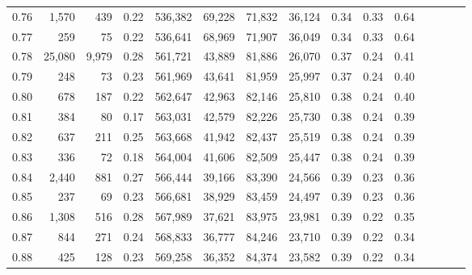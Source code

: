\begin{tabular}{rrrcrrrrrrrrrrr}
0.76 &   1,570 &     439 &                                       0.22 &  536,382 &   69,228 &   71,832 &   36,124 &  0.34 &  0.33 &                         0.64 \\
0.77 &     259 &      75 &                                       0.22 &  536,641 &   68,969 &   71,907 &   36,049 &  0.34 &  0.33 &                         0.64 \\
0.78 &  25,080 &   9,979 &                                       0.28 &  561,721 &   43,889 &   81,886 &   26,070 &  0.37 &  0.24 &                         0.41 \\
0.79 &     248 &      73 &                                       0.23 &  561,969 &   43,641 &   81,959 &   25,997 &  0.37 &  0.24 &                         0.40 \\
0.80 &     678 &     187 &                                       0.22 &  562,647 &   42,963 &   82,146 &   25,810 &  0.38 &  0.24 &                         0.40 \\
0.81 &     384 &      80 &                                       0.17 &  563,031 &   42,579 &   82,226 &   25,730 &  0.38 &  0.24 &                         0.39 \\
0.82 &     637 &     211 &                                       0.25 &  563,668 &   41,942 &   82,437 &   25,519 &  0.38 &  0.24 &                         0.39 \\
0.83 &     336 &      72 &                                       0.18 &  564,004 &   41,606 &   82,509 &   25,447 &  0.38 &  0.24 &                         0.39 \\
0.84 &   2,440 &     881 &                                       0.27 &  566,444 &   39,166 &   83,390 &   24,566 &  0.39 &  0.23 &                         0.36 \\
0.85 &     237 &      69 &                                       0.23 &  566,681 &   38,929 &   83,459 &   24,497 &  0.39 &  0.23 &                         0.36 \\
0.86 &   1,308 &     516 &                                       0.28 &  567,989 &   37,621 &   83,975 &   23,981 &  0.39 &  0.22 &                         0.35 \\
0.87 &     844 &     271 &                                       0.24 &  568,833 &   36,777 &   84,246 &   23,710 &  0.39 &  0.22 &                         0.34 \\
0.88 &     425 &     128 &                                       0.23 &  569,258 &   36,352 &   84,374 &   23,582 &  0.39 &  0.22 &                         0.34 \\

\end{tabular}
